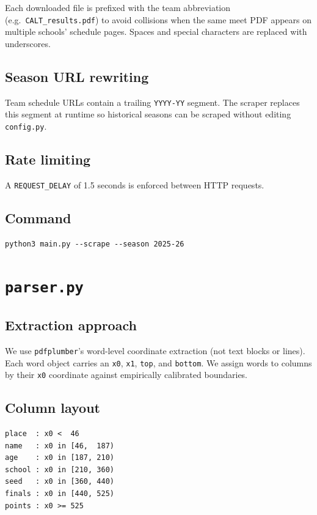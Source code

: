 \documentclass{article}
\begin{document}
Each downloaded file is prefixed with the team abbreviation (e.g.\
\texttt{CALT\_results.pdf}) to avoid collisions when the same meet PDF appears
on multiple schools' schedule pages. Spaces and special characters are replaced
with underscores.

\subsection*{Season URL rewriting}

Team schedule URLs contain a trailing \texttt{YYYY-YY} segment. The scraper
replaces this segment at runtime so historical seasons can be scraped without
editing \texttt{config.py}.

\subsection*{Rate limiting}

A \texttt{REQUEST\_DELAY} of 1.5 seconds is enforced between HTTP requests.

\subsection*{Command}
\begin{lstlisting}
python3 main.py --scrape --season 2025-26
\end{lstlisting}

\section{\texttt{parser.py}}

\subsection*{Extraction approach}

We use \texttt{pdfplumber}'s word-level coordinate extraction (not text blocks
or lines). Each word object carries an \texttt{x0}, \texttt{x1}, \texttt{top},
and \texttt{bottom}. We assign words to columns by their \texttt{x0} coordinate
against empirically calibrated boundaries.

\subsection*{Column layout}

\begin{lstlisting}
place  : x0 <  46
name   : x0 in [46,  187)
age    : x0 in [187, 210)
school : x0 in [210, 360)
seed   : x0 in [360, 440)
finals : x0 in [440, 525)
points : x0 >= 525
\end{lstlisting}
\end{document}
